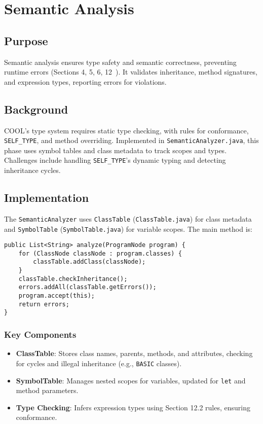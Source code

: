 \documentclass[11pt, titlepage]{article}
\begin{document}
\section{Semantic Analysis}
\label{sec:semantic}

\subsection{Purpose}
Semantic analysis ensures type safety and semantic correctness, preventing runtime errors (Sections 4, 5, 6, 12~\cite{cool_manual}). It validates inheritance, method signatures, and expression types, reporting errors for violations.

\subsection{Background}
COOL's type system requires static type checking, with rules for conformance, \texttt{SELF\_TYPE}, and method overriding. Implemented in \texttt{SemanticAnalyzer.java}, this phase uses symbol tables and class metadata to track scopes and types. Challenges include handling \texttt{SELF\_TYPE}'s dynamic typing and detecting inheritance cycles.

\subsection{Implementation}
The \texttt{SemanticAnalyzer} uses \texttt{ClassTable} (\texttt{ClassTable.java}) for class metadata and \texttt{SymbolTable} (\texttt{SymbolTable.java}) for variable scopes. The main method is:

\begin{lstlisting}
public List<String> analyze(ProgramNode program) {
    for (ClassNode classNode : program.classes) {
        classTable.addClass(classNode);
    }
    classTable.checkInheritance();
    errors.addAll(classTable.getErrors());
    program.accept(this);
    return errors;
}
\end{lstlisting}

\subsubsection{Key Components}

\begin{itemize}[leftmargin=*]
    \item \textbf{ClassTable}: Stores class names, parents, methods, and attributes, checking for cycles and illegal inheritance (e.g., \texttt{BASIC} classes).
    \item \textbf{SymbolTable}: Manages nested scopes for variables, updated for \texttt{let} and method parameters.
    \item \textbf{Type Checking}: Infers expression types using Section 12.2 rules, ensuring conformance.
\end{itemize}
    
\end{document}
